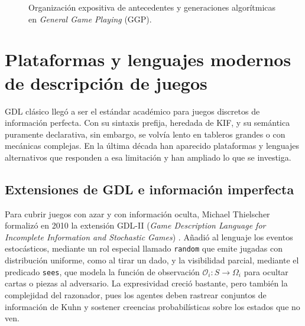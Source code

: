 \begin{figure}[htbp]
\caption{Organización expositiva de antecedentes y generaciones algorítmicas en \textit{General Game Playing} (GGP).}
\label{fig:cronologia_ggp}
\end{figure}

\section{Plataformas y lenguajes modernos de descripción de juegos}

GDL clásico llegó a ser el estándar académico para juegos discretos de información perfecta. Con su sintaxis prefija, heredada de KIF, y su semántica puramente declarativa, sin embargo, se volvía lento en tableros grandes o con mecánicas complejas. En la última década han aparecido plataformas y lenguajes alternativos que responden a esa limitación y han ampliado lo que se investiga.

\subsection{Extensiones de GDL e información imperfecta}

Para cubrir juegos con azar y con información oculta, Michael Thielscher formalizó en 2010 la extensión GDL-II (\textit{Game Description Language for Incomplete Information and Stochastic Games}) \cite{Thielscher2010GDLII}. Añadió al lenguaje los eventos estocásticos, mediante un rol especial llamado \texttt{random} que emite jugadas con distribución uniforme, como al tirar un dado, y la visibilidad parcial, mediante el predicado \texttt{sees}, que modela la función de observación $\mathcal{O}_i : S \to \Omega_i$ para ocultar cartas o piezas al adversario. La expresividad creció bastante, pero también la complejidad del razonador, pues los agentes deben rastrear conjuntos de información de Kuhn y sostener creencias probabilísticas sobre los estados que no ven.

